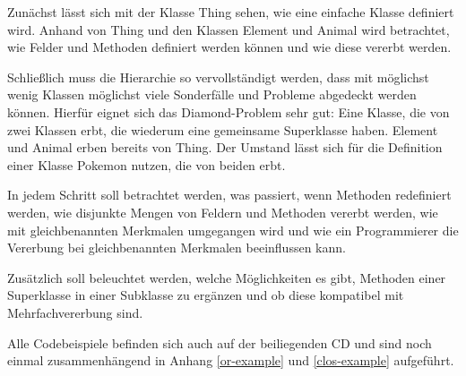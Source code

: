 Zunächst lässt sich mit der Klasse Thing sehen, wie eine einfache Klasse definiert wird. Anhand von Thing und den Klassen Element und Animal wird betrachtet, wie Felder und Methoden definiert werden können und wie diese vererbt werden.

Schließlich muss die Hierarchie so vervollständigt werden, dass mit möglichst wenig Klassen möglichst viele Sonderfälle und Probleme abgedeckt werden können. Hierfür eignet sich das Diamond-Problem sehr gut: Eine Klasse, die von zwei Klassen erbt, die wiederum eine gemeinsame Superklasse haben. Element und Animal erben bereits von Thing. Der Umstand lässt sich für die Definition einer Klasse Pokemon nutzen, die von beiden erbt.

In jedem Schritt soll betrachtet werden, was passiert, wenn Methoden redefiniert werden, wie disjunkte Mengen von Feldern und Methoden vererbt werden, wie mit gleichbenannten Merkmalen umgegangen wird und wie ein Programmierer die Vererbung bei gleichbenannten Merkmalen beeinflussen kann.

Zusätzlich soll beleuchtet werden, welche Möglichkeiten es gibt, Methoden einer Superklasse in einer Subklasse zu ergänzen und ob diese kompatibel mit Mehrfachvererbung sind.

Alle Codebeispiele befinden sich auch auf der beiliegenden CD und sind noch einmal zusammenhängend in Anhang \ref{or-example} und \ref{clos-example} aufgeführt.